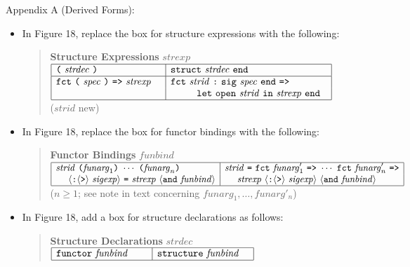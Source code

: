 \documentclass[twoside,titlepage]{article}
\begin{document}
\begin{appendix}
Appendix A (Derived Forms):
\begin{itemize}
\item In Figure 18, replace the box for structure expressions with the following:
  \begin{quote}
  {\bf Structure Expressions} $\mathit{strexp}$ \\
  $\begin{array}{|l|l|}
  \hline
  \mbox{\tt(}~\mathit{strdec}~\mbox{\tt)}~~~~
  & {\tt{struct}}~\mathit{strdec}~{\tt{end}}~~ \\
  \hline
  {\tt{fct}}~\mbox{\tt(}~\mathit{spec}~\mbox{\tt)}~\mbox{\tt=>}~\mathit{strexp}~~~
  & {\tt{fct}}~\mathit{strid}~\mbox{\tt:}~{\tt{sig}}~\mathit{spec}~{\tt{end}}~\mbox{\tt=>}~~ \\
  & ~~~~~~~~{\tt{let}}~{\tt{open}}~\mathit{strid}~{\tt{in}}~\mathit{strexp}~{\tt{end}}~~ \\
  \hline
  \end{array}$ \\
  ($\mathit{strid}$ new) 
  \end{quote}

\item In Figure 18, replace the box for functor bindings with the following:
  \begin{quote}
  {\bf Functor Bindings} $\mathit{funbind}$ \\
  $\begin{array}{|l|l|}
  \hline
  \mathit{strid}~\mbox{\tt(}\mathit{funarg}_1\mbox{\tt)}~\cdots~\mbox{\tt(}\mathit{funarg}_n\mbox{\tt)}
  & \mathit{strid}~\mbox{\tt=}~{\tt{fct}}~\mathit{funarg}'_1~\mbox{\tt=>}~\cdots~{\tt{fct}}~\mathit{funarg}'_n~\mbox{\tt=>} \\
  ~~~~\langle\mbox{\tt:}\langle\mbox{\tt>}\rangle~\mathit{sigexp}\rangle~\mbox{\tt=}~\mathit{strexp}~\langle{\tt{and}}~\mathit{funbind}\rangle
  &~~~~\mathit{strexp}~\langle\mbox{\tt:}\langle\mbox{\tt>}\rangle~\mathit{sigexp}\rangle~\langle{\tt{and}}~\mathit{funbind}\rangle \\
  \hline
  \end{array}$ \\
  ($n\geq1$; see note in text concerning $\mathit{funarg}_1,\dots,\mathit{funarg}'_n$) 
  \end{quote}

\item In Figure 18, add a box for structure declarations as follows:
  \begin{quote}
  {\bf Structure Declarations} $\mathit{strdec}$ \\
  $\begin{array}{|l|l|}
  \hline
  {\tt{functor}}~\mathit{funbind}~~~~~~
  & {\tt{structure}}~\mathit{funbind}~~~ \\
  \hline
  \end{array}$ \\
  \end{quote}


\end{itemize}
\end{appendix}
\end{document}
